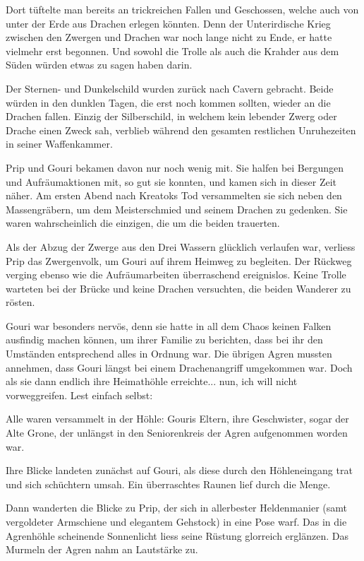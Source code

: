 \documentclass[10pt, a4paper, oneside]{book}
\begin{document}
Dort tüftelte man bereits an trickreichen Fallen und Geschossen, welche auch von unter der Erde aus Drachen erlegen könnten. Denn der Unterirdische Krieg zwischen den Zwergen und Drachen war noch lange nicht zu Ende, er hatte vielmehr erst begonnen. Und sowohl die Trolle als auch die Krahder aus dem Süden würden etwas zu sagen haben darin.

Der Sternen- und Dunkelschild wurden zurück nach Cavern gebracht. Beide würden in den dunklen Tagen, die erst noch kommen sollten, wieder an die Drachen fallen. Einzig der Silberschild, in welchem kein lebender Zwerg oder Drache einen Zweck sah, verblieb während den gesamten restlichen Unruhezeiten in seiner Waffenkammer.

Prip und Gouri bekamen davon nur noch wenig mit. Sie halfen bei Bergungen und Aufräumaktionen mit, so gut sie konnten, und kamen sich in dieser Zeit näher. Am ersten Abend nach Kreatoks Tod versammelten sie sich neben den Massengräbern, um dem Meisterschmied und seinem Drachen zu gedenken. Sie waren wahrscheinlich die einzigen, die um die beiden trauerten.

Als der Abzug der Zwerge aus den Drei Wassern glücklich verlaufen war, verliess Prip das Zwergenvolk, um Gouri auf ihrem Heimweg zu begleiten. Der Rückweg verging ebenso wie die Aufräumarbeiten überraschend ereignislos. Keine Trolle warteten bei der Brücke und keine Drachen versuchten, die beiden Wanderer zu rösten.

Gouri war besonders nervös, denn sie hatte in all dem Chaos keinen Falken ausfindig machen können, um ihrer Familie zu berichten, dass bei ihr den Umständen entsprechend alles in Ordnung war. Die übrigen Agren mussten annehmen, dass Gouri längst bei einem Drachenangriff umgekommen war. Doch als sie dann endlich ihre Heimathöhle erreichte... nun, ich will nicht vorweggreifen. Lest einfach selbst:\bigskip



Alle waren versammelt in der Höhle: Gouris Eltern, ihre Geschwister, sogar der Alte Grone, der unlängst in den Seniorenkreis der Agren aufgenommen worden war.

Ihre Blicke landeten zunächst auf Gouri, als diese durch den Höhleneingang trat und sich schüchtern umsah. Ein überraschtes Raunen lief durch die Menge.

Dann wanderten die Blicke zu Prip, der sich in allerbester Heldenmanier (samt vergoldeter Armschiene und elegantem Gehstock) in eine Pose warf. Das in die Agrenhöhle scheinende Sonnenlicht liess seine Rüstung glorreich erglänzen. Das Murmeln der Agren nahm an Lautstärke zu.
\end{document}
